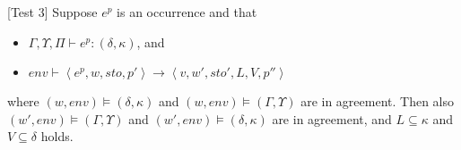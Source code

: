 \documentclass[../../master.tex]{subfiles}
\begin{document}
\begin{theorem}{[Test 3]}
	Suppose $e^p$ is an occurrence and that
	\begin{itemize}
		\item $\Gamma,\Upsilon,\Pi\vdash e^p : (\delta,\kappa)$, and 
		\item $env\vdash\left\langle e^p,w,sto,p'\right\rangle\rightarrow\left\langle v,w',sto',L,V,p''\right\rangle$
	\end{itemize}
	where $(w,env)\models(\delta,\kappa)$ and $(w,env)\models(\Gamma,\Upsilon)$ are in agreement.
	Then also $(w',env)\models(\Gamma,\Upsilon)$ and $(w',env)\models(\delta,\kappa)$ are in agreement, and $L\subseteq\kappa$ and $V\subseteq\delta$ holds.
\end{theorem}
\fi
\end{document}
